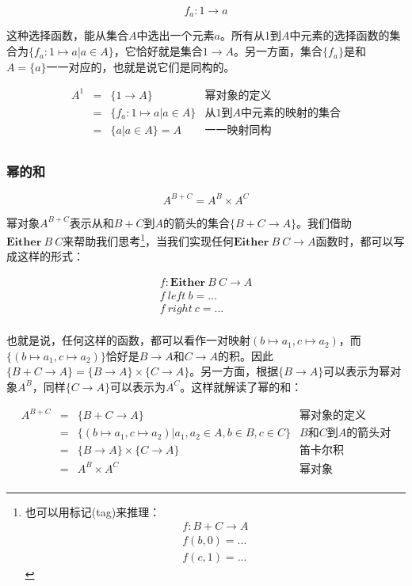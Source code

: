 \documentclass[b5paper]{ctexart}
\begin{document}
\[
  f_a : 1 \to a
\]

这种选择函数，能从集合$A$中选出一个元素$a$。所有从1到$A$中元素的选择函数的集合为$\{f_a : 1 \mapsto a | a \in A\}$，它恰好就是集合$1 \to A$。另一方面，集合$\{ f_a \}$是和$A = \{a\}$一一对应的，也就是说它们是同构的。

\[
\begin{array}{rcll}
A^1 & = & \{ 1 \to A \} & \text{幂对象的定义} \\
    & = & \{ f_a : 1 \mapsto a | a \in A \} & \text{从1到$A$中元素的映射的集合} \\
    & = & \{ a | a \in A \} = A & \text{一一映射同构} \\
\end{array}
\]

\subsubsection{幂的和}

\[
  A^{B + C} = A^B \times A^C
\]

幂对象$A^{B + C}$表示从和$B + C$到$A$的箭头的集合$\{B + C \to A\}$。我们借助$\mathbf{Either}\ B\ C$来帮助我们思考\footnote{也可以用标记(tag)来推理：
\[
\begin{array}{l}
f : B + C \to A \\
f (b, 0) = ... \\
f (c, 1) = ...
\end{array}
\]
}，当我们实现任何$\mathbf{Either}\ B\ C \to A$函数时，都可以写成这样的形式：

\[
\begin{array}{l}
f : \mathbf{Either}\ B\ C \to A \\
f\ left\ b = ... \\
f\ right\ c = ... \\
\end{array}
\]

也就是说，任何这样的函数，都可以看作一对映射$(b \mapsto a_1, c \mapsto a_2)$，而$\{(b \mapsto a_1, c \mapsto a_2)\}$恰好是$B \to A$和$C \to A$的积。因此$\{B + C \to A\} = \{B \to A\} \times \{C \to A\}$。另一方面，根据$\{B \to A\}$可以表示为幂对象$A^B$，同样$\{C \to A\}$可以表示为$A^C$。这样就解读了幂的和：

\[
\begin{array}{rcll}
A^{B + C} & = & \{ B + C \to A \} & \text{幂对象的定义} \\
    & = & \{ (b \mapsto a_1,  c \mapsto a_2) | a_1, a_2 \in A, b \in B, c \in C\} & \text{$B$和$C$到$A$的箭头对} \\
    & = & \{ B \to A \} \times \{ C \to A \} & \text{笛卡尔积} \\
    & = & A^B \times A^C & \text{幂对象} \\
\end{array}
\]
\end{document}
